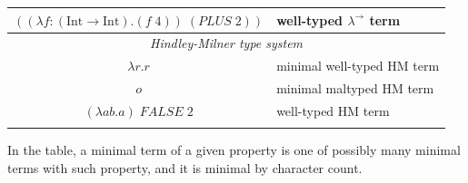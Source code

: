 \documentclass[table, a4paper, 10pt]{article}
\begin{document}
\begin{table}[H]
\begin{tabular}{cl}
\multicolumn{1}{|c|}{$((\lambda f:\mathrm{(Int \to Int)}.(f\;\mathit{4}))\;(\mathit{PLUS}\;\mathit{2}))$}           & \multicolumn{1}{l|}{well-typed $\lambda^\to$ term}                           \\ \hline
\multicolumn{2}{|c|}{\scriptsize \textit{Hindley-Milner type system}}                                                                                                                              \\ \hline
\multicolumn{1}{|c|}{$\lambda r.r$}                                                                                 & \multicolumn{1}{l|}{minimal well-typed HM term}                              \\ \hline
\multicolumn{1}{|c|}{$o$}                                                                                           & \multicolumn{1}{l|}{minimal maltyped HM term}                                \\ \hline
\multicolumn{1}{|c|}{$(\lambda ab.a)\;\mathit{FALSE}\;\mathit{2}$}                                                  & \multicolumn{1}{l|}{well-typed HM term}                                      \\ \hline
\multicolumn{1}{l}{}                                                                                                &                                                                             
\end{tabular}
\end{table}
In the table, a minimal term of a given property is
one of possibly many minimal terms with such property,
and it is minimal by character count.
\clearpage
\end{document}
